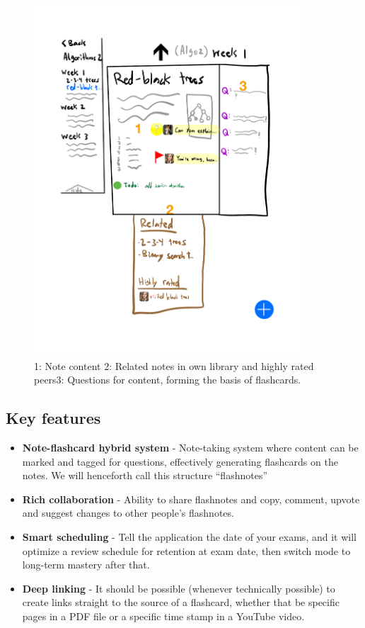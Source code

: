 \begin{figure}
\centering
\includegraphics[width=0.90000\textwidth]{assets/Flashnotev2-3.pdf}
\caption{1: Note content 2: Related notes in own library and highly
rated peers3: Questions for content, forming the basis of
flashcards.}\label{fig:ui3}
\end{figure}

\subsection{Key features}\label{key-features}

\begin{itemize}
\tightlist
\item
  \textbf{Note-flashcard hybrid system} - Note-taking system where
  content can be marked and tagged for questions, effectively generating
  flashcards on the notes. We will henceforth call this structure
  ``flashnotes''
\item
  \textbf{Rich collaboration} - Ability to share flashnotes and copy,
  comment, upvote and suggest changes to other people's flashnotes.
\item
  \textbf{Smart scheduling} - Tell the application the date of your
  exams, and it will optimize a review schedule for retention at exam
  date, then switch mode to long-term mastery after that.
\item
  \textbf{Deep linking} - It should be possible (whenever technically
  possible) to create links straight to the source of a flashcard,
  whether that be specific pages in a PDF file or a specific time stamp
  in a YouTube video.
\end{itemize}

